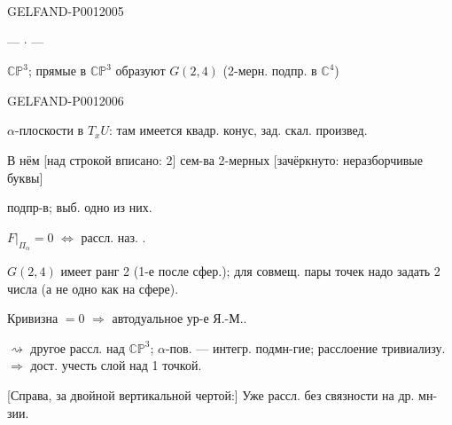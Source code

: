 \begin{GelfandAdjacentEvidence}{GELFAND-P001200}{5}


\begin{center}--- \(\cdot\) ---\end{center}

$\mathbb{CP}^3$; прямые в $\mathbb{CP}^3$ образуют $G(2,4)$
(2-мерн. подпр. в $\mathbb C^4$)

\end{GelfandAdjacentEvidence}
\begin{GelfandAdjacentEvidence}{GELFAND-P001200}{6}


$\alpha$-плоскости в $T_xU$: там имеется квадр. конус, зад. скал. произвед.

В нём [над строкой вписано: 2] сем-ва 2-мерных [зачёркнуто:
неразборчивые буквы]
\end{GelfandAdjacentEvidence}

подпр-в; выб. одно из них.

$F|_{\Pi_\alpha}=0$ $\Longleftrightarrow$ рассл. наз. .

$G(2,4)$ имеет ранг 2 (1-е после сфер.); для совмещ. пары точек надо задать 2 числа (а не одно как на сфере).

Кривизна $=0$ $\Longrightarrow$ автодуальное ур-е Я.-М..

$\rightsquigarrow$ другое рассл. над $\mathbb{CP}^3$;
$\alpha$-пов. — интегр. подмн-гие; расслоение тривиализу. $\Longrightarrow$ дост. учесть слой над 1 точкой.

[Справа, за двойной вертикальной чертой:] Уже рассл. без связности на др. мн-зии.


